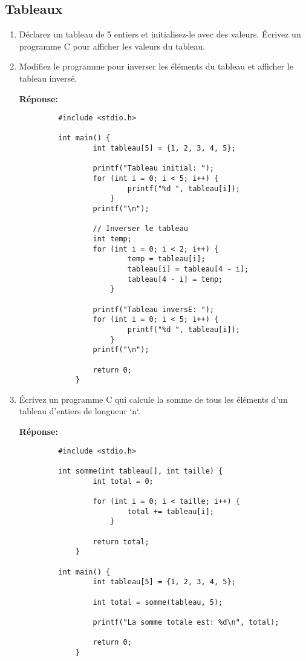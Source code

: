 \subsection{Tableaux}
\begin{enumerate}
	\item Déclarez un tableau de 5 entiers et initialisez-le avec des valeurs. Écrivez un programme C pour afficher les valeurs du tableau.
	\item Modifiez le programme pour inverser les éléments du tableau et afficher le tableau inversé.

	 \textbf{Réponse:}
	 \begin{lstlisting}
		 #include <stdio.h>
		
		 int main() {
			     int tableau[5] = {1, 2, 3, 4, 5};
			
			     printf("Tableau initial: ");
			     for (int i = 0; i < 5; i++) {
				         printf("%d ", tableau[i]);
				     }
			     printf("\n");
			
			     // Inverser le tableau
			     int temp;
			     for (int i = 0; i < 2; i++) {
				         temp = tableau[i];
				         tableau[i] = tableau[4 - i];
				         tableau[4 - i] = temp;
				     }
			
			     printf("Tableau inversE: ");
			     for (int i = 0; i < 5; i++) {
				         printf("%d ", tableau[i]);
				     }
			     printf("\n");
			
			     return 0;
			 }
		 \end{lstlisting}
	
	\item Écrivez un programme C qui calcule la somme de tous les éléments d'un tableau d'entiers de longueur `n`.


	 \textbf{Réponse:}
	 \begin{lstlisting}
		 #include <stdio.h>
		
		 int somme(int tableau[], int taille) {
			     int total = 0;
			
			     for (int i = 0; i < taille; i++) {
				         total += tableau[i];
				     }
			
			     return total;
			 }
		
		 int main() {
			     int tableau[5] = {1, 2, 3, 4, 5};
			
			     int total = somme(tableau, 5);
			
			     printf("La somme totale est: %d\n", total);
			
			     return 0;
			 }
		 \end{lstlisting}
	

\end{enumerate}
